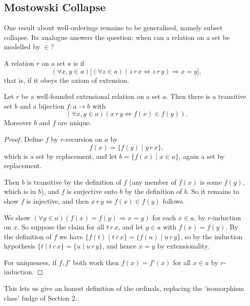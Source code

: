 \subsection{Mostowski Collapse}

One result about well-orderings remains to be generalised, namely subset collapse. Its analogue answers the question: when can a relation on a set be modelled by $\in$?

\begin{definition}
  A relation $r$ on a set $a$ is  if
  $$
  (\forall x, y \in a)\bigl[(\forall z \in a)(z \, r \, x \Leftrightarrow z \, r \, y) \Rightarrow x = y\bigr],
  $$
  that is, if it obeys the axiom of extension.
\end{definition}

\begin{theorem}\label{thm:mostowski}
  Let $r$ be a well-founded extensional relation on a set $a$. Then there is a transitive set $b$ and a bijection $f: a \rightarrow b$ with
  $$(\forall x, y \in a)(x \, r \, y \Leftrightarrow f(x) \in f(y)).$$
  Moreover $b$ and $f$ are unique.
\end{theorem}
\begin{proof}
  Define $f$ by $r$-recursion on $a$ by
  $$f(x) = \{f(y) \mid y \, r \, x\},$$
  which is a set by replacement, and let $b = \{f(x) \mid x \in a\}$, again a set by replacement.

  Then $b$ is transitive by the definition of $f$ (any member of $f(x)$ is some $f(y)$, which is in $b$), and $f$ is surjective onto $b$ by the definition of $b$. So it remains to show $f$ is injective, and then $x \, r\, y \Leftrightarrow f(x) \in f(y)$ follows.

  We show $(\forall y \in a)(f(x) = f(y) \Rightarrow x = y)$ for each $x \in a$, by $r$-induction on $x$. So suppose the claim for all $t \, r \, x$, and let $y \in a$ with $f(x) = f(y)$. By the definition of $f$ we have $\{f(t) \mid t \, r\, x\} = \{f(u) \mid u \, r \, y\}$, so by the induction hypothesis $\{t \mid t \, r \, x\} = \{u \mid u\, r\, y\}$, and hence $x = y$ by extensionality.

  For uniqueness, if $f, f'$ both work then $f(x) = f'(x)$ for all $x \in a$ by $r$-induction.
\end{proof}

This lets us give an honest definition of the ordinals, replacing the `isomorphism class' fudge of Section 2.

